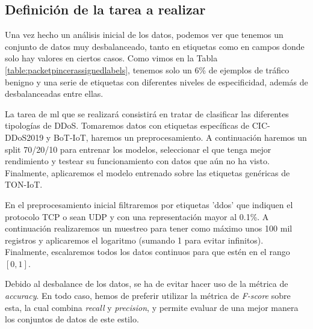 \color{blue} %
\subsection{Definición de la tarea a realizar}

Una vez hecho un análisis inicial de los datos, podemos ver que tenemos un conjunto de datos muy desbalanceado, tanto en etiquetas como en campos donde solo hay valores en ciertos casos. Como vimos en la Tabla \ref{table:packetpincerassignedlabels}, tenemos solo un 6\% de ejemplos de tráfico benigno y una serie de etiquetas con diferentes niveles de especificidad, además de desbalanceadas entre ellas. 

La tarea de \gls{ml} que se realizará consistirá en tratar de clasificar las diferentes tipologías de DDoS. Tomaremos datos con etiquetas específicas de CIC-DDoS2019 y BoT-IoT, haremos un preprocesamiento. A continuación haremos un split 70/20/10 para entrenar los modelos, seleccionar el que tenga mejor rendimiento y testear su funcionamiento con datos que aún no ha visto. Finalmente, aplicaremos el modelo entrenado sobre las etiquetas genéricas de TON-IoT. %

En el preprocesamiento inicial filtraremos por etiquetas 'ddos' que indiquen el protocolo TCP o sean UDP y con una representación mayor al 0.1\%. A continuación realizaremos un muestreo para tener como máximo unos 100 mil registros y aplicaremos el logaritmo (sumando 1 para evitar infinitos). Finalmente, escalaremos todos los datos continuos para que estén en el rango $[0, 1]$. %

Debido al desbalance de los datos, se ha de evitar hacer uso de la métrica de \textit{accuracy}. En todo caso, hemos de preferir utilizar la métrica de \textit{F-score} sobre esta, la cual combina \textit{recall} y \textit{precision}, y permite evaluar de una mejor manera los conjuntos de datos de este estilo.



